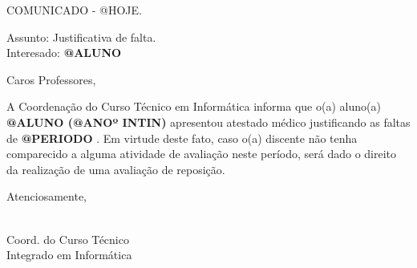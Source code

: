 \documentclass[a5paper, 12pt]{letter}
\begin{document}
\noindent COMUNICADO - @HOJE.

\noindent Assunto: Justificativa de falta.\\
Interesado: {\bf @ALUNO }

\noindent Caros Professores,

\onehalfspacing A Coordenação do Curso Técnico em Informática informa que o(a) aluno(a) {\bf @ALUNO (@ANOº INTIN) } apresentou atestado médico justificando as faltas de {\bf @PERIODO }. Em virtude deste fato, caso o(a) discente não tenha comparecido a alguma atividade de avaliação neste período, será dado o direito da realização de uma avaliação de reposição.

\noindent Atenciosamente,

\begin{flushright}
\\
\indent Coord. do Curso Técnico\\
\indent Integrado em Informática\\
\end{flushright}
\end{document}
